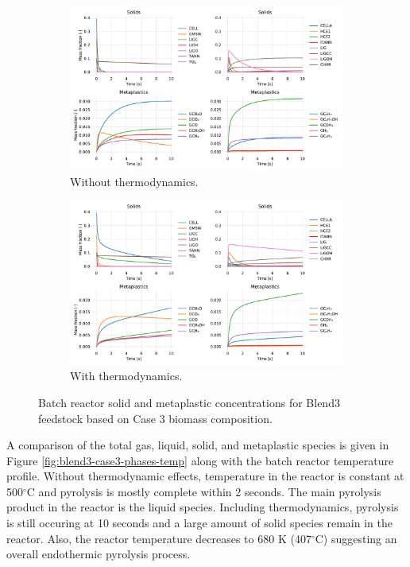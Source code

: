 \begin{figure}[H]
    \begin{subfigure}{\textwidth}
        \centering
        \includegraphics[width=\textwidth]{figures/blend3-case3-solids-meta.pdf}
        \caption{Without thermodynamics.}
    \end{subfigure}
    \begin{subfigure}{\textwidth}
        \centering
        \includegraphics[width=\textwidth]{figures/blend3-case3-solids-meta-thermo.pdf}
        \caption{With thermodynamics.}
    \end{subfigure}
    \caption{Batch reactor solid and metaplastic concentrations for Blend3 feedstock based on Case 3 biomass composition.}
    \label{fig:blend3-case3-solids-meta}
\end{figure}

A comparison of the total gas, liquid, solid, and metaplastic species is given in Figure \ref{fig:blend3-case3-phases-temp} along with the batch reactor temperature profile. Without thermodynamic effects, temperature in the reactor is constant at 500$^{\circ}$C and pyrolysis is mostly complete within 2 seconds. The main pyrolysis product in the reactor is the liquid species. Including thermodynamics, pyrolysis is still occuring at 10 seconds and a large amount of solid species remain in the reactor. Also, the reactor temperature decreases to 680 K (407$^{\circ}$C) suggesting an overall endothermic pyrolysis process.

